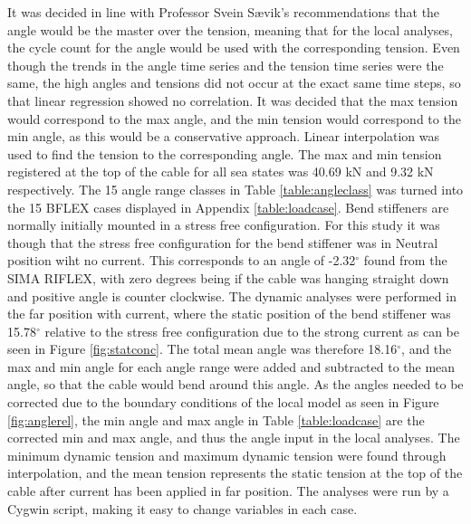 \noindent It was decided in line with Professor Svein Sævik's recommendations that the angle would be the master over the tension, meaning that for the local analyses, the cycle count for the angle would be used with the corresponding tension. Even though the trends in the angle time series and the tension time series were the same, the high angles and tensions did not occur at the exact same time steps, so that linear regression showed no correlation. It was decided that the max tension would correspond to the max angle, and the min tension would correspond to the min angle, as this would be a conservative approach.  Linear interpolation was used to find the tension to the corresponding angle. The max and min tension registered at the top of the cable for all sea states was 40.69 kN and 9.32 kN respectively. \newline
\newline
\noindent The 15 angle range classes in Table \ref{table:angleclass} was turned into the 15 BFLEX cases displayed in Appendix \ref{table:loadcase}. Bend stiffeners are normally initially mounted in a stress free configuration. For this study it was though that the stress free configuration for the bend stiffener was in Neutral position wiht no current. This corresponds to an angle of -2.32$^\circ$ found from the SIMA RIFLEX, with zero degrees being if the cable was hanging straight down and positive angle is counter clockwise. The dynamic analyses were performed in the far position with current, where the static position of the bend stiffener was 15.78$^\circ$ relative to the stress free configuration due to the strong current as can be seen in Figure \ref{fig:statconc}. The total mean angle was therefore 18.16$^\circ$, and the max and min angle for each angle range were added and subtracted to the mean angle, so that the cable would bend around this angle. As the angles needed to be corrected due to the boundary conditions of the local model as seen in Figure \ref{fig:anglerel}, the min angle and max angle in Table \ref{table:loadcase} are the corrected min and max angle, and thus the angle input in the local analyses. The minimum dynamic tension and maximum dynamic tension were found through interpolation, and the mean tension represents the static tension at the top of the cable after current has been applied in far position. The analyses were run by a Cygwin script, making it easy to change variables in each case. 


